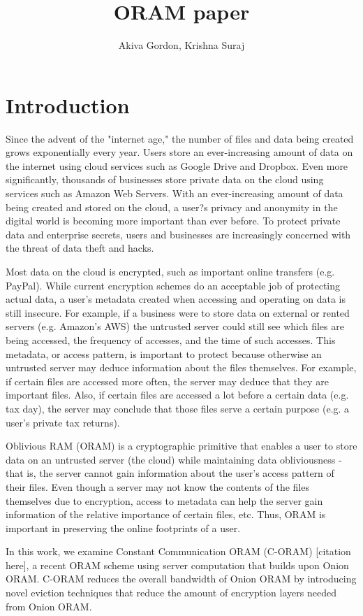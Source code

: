 \documentclass[12pt, oneside]{amsart}   	%
\title{ORAM paper}
\author{Akiva Gordon, Krishna Suraj}
\begin{document}
\maketitle
\section{Introduction}
Since the advent of the "internet age," the number of files and data being created grows exponentially every year. Users store an ever-increasing amount of data on the internet using cloud services such as Google Drive and Dropbox. Even more significantly, thousands of businesses store private data on the cloud using services such as Amazon Web Servers. With an ever-increasing amount of data being created and stored on the cloud, a user?s privacy and anonymity in the digital world is becoming more important than ever before. To protect private data and enterprise secrets, users and businesses are increasingly concerned with the threat of data theft and hacks.

Most data on the cloud is encrypted, such as important online transfers (e.g. PayPal). While current encryption schemes do an acceptable job of protecting actual data, a user's metadata created when accessing and operating on data is still insecure. For example, if a business were to store data on external or rented servers (e.g. Amazon's AWS) the untrusted server could still see which files are being accessed, the frequency of accesses, and the time of such accesses. This metadata, or access pattern, is important to protect because otherwise an untrusted server may deduce information about the files themselves. For example, if certain files are accessed more often, the server may deduce that they are important files. Also, if certain files are accessed a lot before a certain data (e.g. tax day), the server may conclude that those files serve a certain purpose (e.g. a user's private tax returns).

Oblivious RAM (ORAM) is a cryptographic primitive that enables a user to store data on an untrusted server (the cloud) while maintaining data obliviousness - that is, the server cannot gain information about the user's access pattern of their files. Even though a server may not know the contents of the files themselves due to encryption, access to metadata can help the server gain information of the relative importance of certain files, etc. Thus, ORAM is important in preserving the online footprints of a user. 

In this work, we examine Constant Communication ORAM (C-ORAM) [citation here], a recent ORAM scheme using server computation that builds upon Onion ORAM. C-ORAM reduces the overall bandwidth of Onion ORAM by introducing novel eviction techniques that reduce the amount of encryption layers needed from Onion ORAM.
\end{document}
